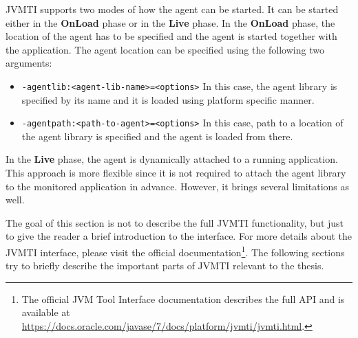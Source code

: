 JVMTI supports two modes of how the agent can be started. It can be started either in the \textbf{OnLoad} phase or in the \textbf{Live} phase. In the \textbf{OnLoad} phase, the location of the agent has to be specified and the agent is started together with the application. The agent location can be specified using the following two arguments:
\begin{itemize}
	\item \texttt{-agentlib:<agent-lib-name>=<options>} \newline
	In this case, the agent library is specified by its name and it is loaded using platform specific manner.
	\item \texttt{-agentpath:<path-to-agent>=<options>} \newline
	In this case, path to a location of the agent library is specified and the agent is loaded from there.
\end{itemize}

In the \textbf{Live} phase, the agent is dynamically attached to a running application. This approach is more flexible since it is not required to attach the agent library to the monitored application in advance. However, it brings several limitations as well.

The goal of this section is not to describe the full JVMTI functionality, but just to give the reader a brief introduction to the interface. For more details about the JVMTI interface, please visit the official documentation\footnote{The official JVM Tool Interface documentation describes the full API and is available at \url{https://docs.oracle.com/javase/7/docs/platform/jvmti/jvmti.html}.}. The following sections try to briefly describe the important parts of JVMTI relevant to the thesis.


